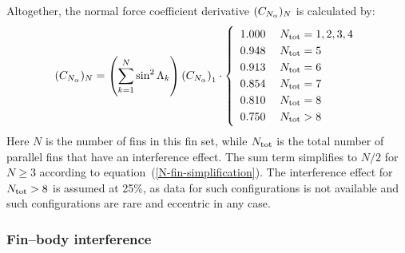 \pagebreak[4]
Altogether, the normal force coefficient derivative $({C_{N_\alpha}})_N$ is
calculated by:
%
\begin{equation}
(\CNa)_N = \del{\sum_{k=1}^N \sin^2\Lambda_k} \del{\CNa}_1 \cdot
  \left\{ 
\begin{array}{ll}
  1.000\; & N_{\rm tot}=1,2,3,4  \vspace{1mm}\\
  0.948\; & N_{\rm tot}=5  \vspace{1mm}\\
  0.913\; & N_{\rm tot}=6  \vspace{1mm}\\
  0.854\; & N_{\rm tot}=7  \vspace{1mm}\\
  0.810\; & N_{\rm tot}=8  \vspace{1mm}\\
  0.750\; & N_{\rm tot}>8
\end{array}
  \right.
\end{equation}
%
%
Here $N$ is the number of fins in this fin set, while $N_{\rm tot}$ is
the total number of parallel fins that have an interference effect.
The sum term simplifies to $N/2$ for $N\geq3$ according to
equation~(\ref{N-fin-simplification}).  The interference effect for
$N_{\rm tot}>8$ is assumed at 25\%, as data for such configurations is
not available and such configurations are rare and eccentric in any
case.

\subsubsection{Fin--body interference}

